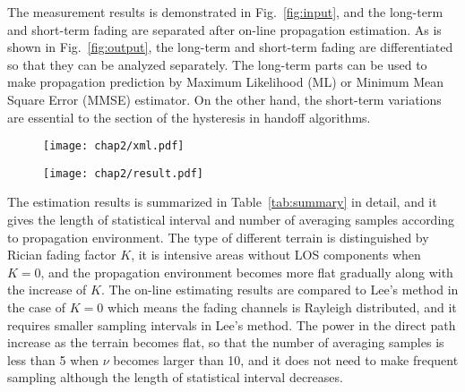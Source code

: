 The measurement results is demonstrated in Fig.~\ref{fig:input}, and the long-term and short-term fading are separated after on-line propagation estimation. As is shown in Fig.~\ref{fig:output}, the long-term and short-term fading are differentiated so that they can be analyzed separately. The long-term parts can be used to make propagation prediction by Maximum Likelihood (ML) or Minimum Mean Square Error (MMSE) estimator. On the other hand, the short-term variations are essential to the section of the hysteresis in handoff algorithms.

\begin{figure}[!htp]
\centering
\texttt{[image: chap2/xml.pdf]}
\end{figure}

\begin{figure}[!htp]
\centering
\texttt{[image: chap2/result.pdf]}
\end{figure}

The estimation results is summarized in Table~\ref{tab:summary} in detail, and it gives the length of statistical interval and number of averaging samples according to propagation environment. The type of different terrain is distinguished by Rician fading factor $K$, it is intensive areas without LOS components when $K=0$, and the propagation environment becomes more flat gradually along with the increase of $K$. The on-line estimating results are compared to Lee's method in the case of $K=0$ which means the fading channels is Rayleigh distributed, and it requires smaller sampling intervals in Lee's method. The power in the direct path increase as the terrain becomes flat, so that the number of averaging samples is less than 5 when $\nu$ becomes larger than 10, and it does not need to make frequent sampling although the length of statistical interval decreases.

